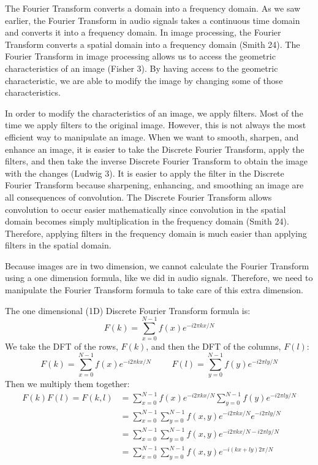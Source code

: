 \documentclass [../article.tex]{subfiles}
\begin{document}
  The Fourier Transform converts a domain into a frequency domain.
  As we saw earlier, the Fourier Transform in audio signals takes
  a continuous time domain and converts it into a frequency domain.
  In image processing, the Fourier Transform converts a spatial
  domain into a frequency domain (Smith 24).  The Fourier Transform
  in image processing allows us to access the geometric
  characteristics of an image (Fisher 3).  By having access to the
  geometric characteristic, we are able to modify the image by
  changing some of those characteristics.

  In order to modify the characteristics of an image, we apply
  filters. Most of the time we apply filters to the original
  image. However, this is not always the most efficient way to
  manipulate an image. When we want to smooth, sharpen, and enhance
  an image, it is easier to take the Discrete Fourier Transform,
  apply the filters, and then take the inverse Discrete Fourier
  Transform to obtain the image with the changes (Ludwig 3).  It
  is easier to apply the filter in the Discrete Fourier Transform
  because sharpening, enhancing, and smoothing an image are all
  consequences of convolution.  The Discrete Fourier Transform
  allows convolution to occur easier mathematically since
  convolution in the spatial domain becomes simply multiplication
  in the frequency domain (Smith 24).  Therefore, applying filters
  in the frequency domain is much easier than applying filters in
  the spatial domain.

  Because images are in two dimension, we cannot calculate the
  Fourier Transform using a one dimension formula, like we did in
  audio signals.  Therefore, we need to manipulate the Fourier
  Transform formula to take care of this extra dimension.

  The one dimensional (1D) Discrete Fourier Transform formula is:
  \[ F(k) = \sum_{x=0}^{N-1}f(x)e^{-i2\pi kx/N} \]
  We take the DFT of the rows, $F(k)$, and then the DFT of the
  columns, $F(l)$:
  \[F(k) = \sum_{x=0}^{N-1}f(x)e^{-i2\pi kx/N}
    \phantom{space}
    F(l) = \sum_{y=0}^{N-1}f(y)e^{-i2\pi ly/N}\]
  Then we multiply them together:
  \begin{align*}
    F(k)F(l) = F(k,l) &=
    \sum_{x=0}^{N-1}f(x)e^{-i2\pi kx/N}
    \sum_{y=0}^{N-1}f(y)e^{-i2\pi ly/N}\\
    {} &= \sum_{x=0}^{N-1}\sum_{y=0}^{N-1}f(x,y)
    e^{-i2\pi kx/N}e^{-i2\pi ly/N}\\
    {} &= \sum_{x=0}^{N-1}\sum_{y=0}^{N-1}f(x,y)
    e^{-i2\pi kx/N - i2\pi ly/N}\\
    {} &= \sum_{x=0}^{N-1}\sum_{y=0}^{N-1}f(x,y)
    e^{-i(kx+ly)2\pi/N }
  \end{align*}
\end{document}
